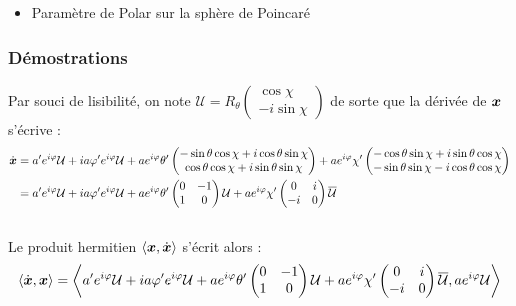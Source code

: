 \begin{annexe}
\begin{itemize}
	\item Paramètre de Polar sur la sphère de Poincaré
	
\end{itemize}


\subsubsection{Démostrations}\label{ann:demo_phases_2var}

\begin{demo}
	Par souci de lisibilité, on note $\mathcal{U} = R_{\theta} \begin{pmatrix} \cos\chi \\ -i\sin\chi \end{pmatrix}$ de sorte que la dérivée de $\boldsymbol{x}$ s'écrive :
	\begin{align*}
		\dot{\boldsymbol{x}} 
		&= a'e^{i\varphi}\mathcal{U} + ia\varphi'e^{i\varphi} \mathcal{U} + ae^{i\varphi}\theta'\begin{pmatrix} -\sin\theta \cos\chi + i\cos\theta \sin\chi \\ \cos\theta \cos\chi + i\sin\theta \sin\chi \end{pmatrix} + ae^{i\varphi}\chi'\begin{pmatrix} -\cos\theta \sin\chi + i\sin\theta \cos\chi \\ -\sin\theta \sin\chi - i\cos\theta \cos\chi \end{pmatrix} \\
		&= a'e^{i\varphi}\mathcal{U} + ia\varphi'e^{i\varphi} \mathcal{U} + ae^{i\varphi}\theta'\begin{pmatrix} 0 & -1 \\ 1 & 0 \end{pmatrix}\mathcal{U} + ae^{i\varphi}\chi'\begin{pmatrix} 0 & i \\ -i & 0 \end{pmatrix}\overline{\mathcal{U}}
	\end{align*}
	\\
	Le produit hermitien $\langle \boldsymbol{x}, \dot{\boldsymbol{x}}\rangle$ s'écrit alors :
	\begin{align*}
		\langle \dot{\x}, \x \rangle 
		&= \left\langle a'e^{i\varphi}\mathcal{U} + ia\varphi'e^{i\varphi} \mathcal{U} + ae^{i\varphi}\theta'\begin{pmatrix} 0 & -1 \\ 1 & 0 \end{pmatrix}\mathcal{U} + ae^{i\varphi}\chi'\begin{pmatrix} 0 & i \\ -i & 0 \end{pmatrix}\congu{\mathcal{U}}, ae^{i\varphi}\mathcal{U} \right\rangle \\

\end{align*}
\end{demo}
\end{annexe}
